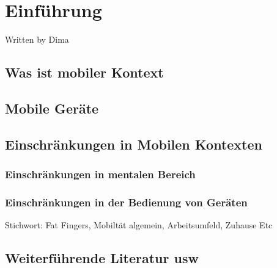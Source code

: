 
\section{Einführung}

Written by Dima

\subsection{Was ist mobiler Kontext} %
\label{sub:was_ist_mobiler_kontext}

\subsection{Mobile Geräte} %
\label{sub:mobile_ger_te}


\subsection{Einschränkungen in Mobilen Kontexten} %
\label{sub:einschr_nkungen_in_mobilen_kontexten}


\subsubsection{Einschränkungen in mentalen Bereich} %
\label{ssub:einschr_nkungen_in_mentalen_bereich}


\subsubsection{Einschränkungen in der Bedienung von Geräten} %
\label{ssub:einschr_nkungen_in_bedienung}

Stichwort: Fat Fingers, Mobiltät algemein, Arbeitsumfeld, Zuhause Etc


\subsection{Weiterführende Literatur usw} %
\label{ssub:weiterf_hrung}

